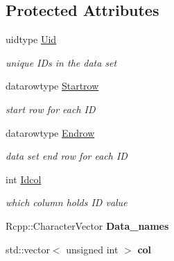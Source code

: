 \subsection*{Protected Attributes}
\begin{DoxyCompactItemize}
\item 
\mbox{\label{classdataobject_af7f42037224a63f823942bee20564f4b}} 
uidtype \hyperlink{classdataobject_af7f42037224a63f823942bee20564f4b}{Uid}
\begin{DoxyCompactList}\small\item\em unique I\+Ds in the data set \end{DoxyCompactList}\item 
\mbox{\label{classdataobject_a1af99aa30e3fa3f4228d23910ec1d662}} 
datarowtype \hyperlink{classdataobject_a1af99aa30e3fa3f4228d23910ec1d662}{Startrow}
\begin{DoxyCompactList}\small\item\em start row for each ID \end{DoxyCompactList}\item 
\mbox{\label{classdataobject_add8078bc49b2517acb741f4e41dc279b}} 
datarowtype \hyperlink{classdataobject_add8078bc49b2517acb741f4e41dc279b}{Endrow}
\begin{DoxyCompactList}\small\item\em data set end row for each ID \end{DoxyCompactList}\item 
\mbox{\label{classdataobject_a71ba45d63a4ba661e61763ebcedf7992}} 
int \hyperlink{classdataobject_a71ba45d63a4ba661e61763ebcedf7992}{Idcol}
\begin{DoxyCompactList}\small\item\em which column holds ID value \end{DoxyCompactList}\item 
\mbox{\label{classdataobject_a7fd729533f43533d03269d89ea304086}} 
Rcpp\+::\+Character\+Vector {\bfseries Data\+\_\+names}
\item 
\mbox{\label{classdataobject_a8831d627f892595fd54c27dc25dcd607}} 
std\+::vector$<$ unsigned int $>$ {\bfseries col}
\item 

\end{DoxyCompactItemize}
